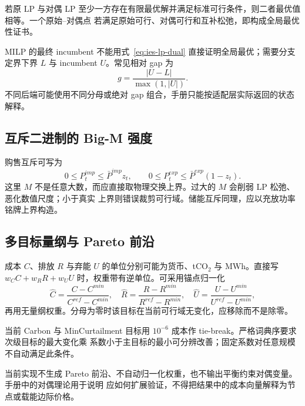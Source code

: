 \begin{theorem}[强对偶与最优性证书]
若原 LP 与对偶 LP 至少一方存在有限最优解并满足标准可行条件，则二者最优值相等。一个原始--对偶点
若满足原始可行、对偶可行和互补松弛，即构成全局最优性证书。
\end{theorem}

MILP 的最终 incumbent 不能用式~\eqref{eq:ies-lp-dual} 直接证明全局最优；需要分支定界下界 $L$ 与
incumbent $U$。常见相对 gap 为
\begin{equation}
 g=\frac{|U-L|}{\max(1,|U|)}.
 \label{eq:ies-mip-gap}
\end{equation}
不同后端可能使用不同分母或绝对 gap 组合，手册只能按适配层实际返回的状态解释。

\subsection{互斥二进制的 Big-M 强度}

购售互斥可写为
\begin{equation}
 0\le P_t^{imp}\le \bar P^{imp}z_t,\qquad
 0\le P_t^{exp}\le \bar P^{exp}(1-z_t).
 \label{eq:ies-grid-binary}
\end{equation}
这里 $M$ 不是任意大数，而应直接取物理交换上界。过大的 $M$ 会削弱 LP 松弛、恶化数值尺度；小于真实
上界则错误裁剪可行域。储能互斥同理，应以充放功率铭牌上界构造。

\subsection{多目标量纲与 Pareto 前沿}

成本 $C$、排放 $R$ 与弃能 $U$ 的单位分别可能为货币、tCO$_2$ 与 MWh。直接写
$w_CC+w_RR+w_UU$ 时，权重带有逆单位。可采用锚点归一化
\begin{equation}
 \hat C=\frac{C-C^{min}}{C^{ref}-C^{min}},\quad
 \hat R=\frac{R-R^{min}}{R^{ref}-R^{min}},\quad
 \hat U=\frac{U-U^{min}}{U^{ref}-U^{min}},
 \label{eq:ies-objective-normalization}
\end{equation}
再用无量纲权重。分母为零时该目标在当前可行域无变化，应移除而不是除零。

当前 Carbon 与 MinCurtailment 目标用 $10^{-6}$ 成本作 tie-break。严格词典序要求次级目标的最大变化乘
系数小于主目标的最小可分辨改善；固定系数对任意规模不自动满足此条件。

\begin{gapnote}
当前实现不生成 Pareto 前沿、不自动归一化权重，也不输出平衡约束对偶变量。手册中的对偶理论用于说明
应如何扩展验证，不得把结果中的成本向量解释为节点或载能边际价格。
\end{gapnote}

